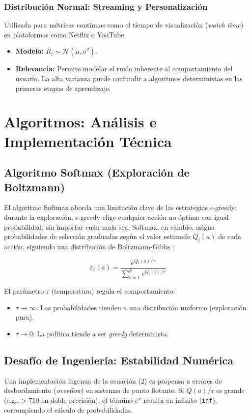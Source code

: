 \documentclass[a4paper,11pt]{article}
\begin{document}
\subsubsection{Distribución Normal: Streaming y Personalización}
Utilizada para métricas continuas como el tiempo de visualización (\textit{watch time}) en plataformas como Netflix o YouTube.
\begin{itemize}
    \item \textbf{Modelo:} $R_t \sim \mathcal{N}(\mu, \sigma^2)$.
    \item \textbf{Relevancia:} Permite modelar el ruido inherente al comportamiento del usuario. La alta varianza puede confundir a algoritmos deterministas en las primeras etapas de aprendizaje.
\end{itemize}

\section{Algoritmos: Análisis e Implementación Técnica}

\subsection{Algoritmo Softmax (Exploración de Boltzmann)}
El algoritmo Softmax aborda una limitación clave de las estrategias $\epsilon$-greedy: durante la exploración, $\epsilon$-greedy elige cualquier acción no óptima con igual probabilidad, sin importar cuán mala sea. Softmax, en cambio, asigna probabilidades de selección graduadas según el valor estimado $Q_t(a)$ de cada acción, siguiendo una distribución de Boltzmann-Gibbs \cite{sutton2018}:

\begin{equation}
    \pi_t(a) = \frac{e^{Q_t(a) / \tau}}{\sum_{b=1}^{k} e^{Q_t(b) / \tau}}
\end{equation}

El parámetro $\tau$ (temperatura) regula el comportamiento:
\begin{itemize}
    \item $\tau \to \infty$: Las probabilidades tienden a una distribución uniforme (exploración pura).
    \item $\tau \to 0$: La política tiende a ser \textit{greedy} determinista.
\end{itemize}

\subsection{Desafío de Ingeniería: Estabilidad Numérica}
Una implementación ingenua de la ecuación (2) es propensa a errores de desbordamiento (\textit{overflow}) en sistemas de punto flotante. Si $Q(a)/\tau$ es grande (e.g., > 710 en doble precisión), el término $e^x$ resulta en infinito (\texttt{inf}), corrompiendo el cálculo de probabilidades.
\end{document}
